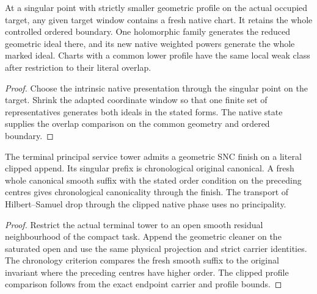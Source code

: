 \begin{theorem}
\label{hir:g8-fresh-native-lower-cut}
\leanok
At a singular point with strictly smaller geometric profile on the
actual occupied target, any given target window contains a fresh
native chart. It retains the whole controlled ordered boundary.
One holomorphic family generates the reduced geometric ideal there,
and its new native weighted powers generate the whole marked ideal.
Charts with a common lower profile have the same local weak class
after restriction to their literal overlap.
\end{theorem}
\begin{proof}
Choose the intrinsic native presentation through the singular
point on the target. Shrink the adapted coordinate window so that
one finite set of representatives generates both ideals in the
stated forms. The native state supplies the overlap comparison on
the common geometry and ordered boundary.
\end{proof}

\begin{theorem}
\label{hir:g8-actual-compact-principal-snc-finish}
\leanok
The terminal principal service tower admits a geometric SNC finish
on a literal clipped append. Its singular prefix is chronological
original canonical. A fresh whole canonical smooth suffix with the
stated order condition on the preceding centres gives chronological
canonicality through the finish. The transport of Hilbert--Samuel
drop through the clipped native phase uses no principality.
\end{theorem}
\begin{proof}
Restrict the actual terminal tower to an open smooth residual
neighbourhood of the compact task. Append the geometric cleaner
on the saturated open and use the same physical projection and
strict carrier identities. The chronology criterion compares the
fresh smooth suffix to the original invariant where the preceding
centres have higher order. The clipped profile comparison follows
from the exact endpoint carrier and profile bounds.
\end{proof}

